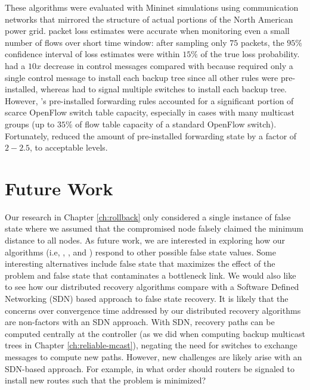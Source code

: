 These algorithms were evaluated with Mininet simulations using communication networks that mirrored the structure of actual portions of the North American power grid.
\pcnt packet loss estimates were accurate when monitoring even a small number of flows over short time window: after sampling only $75$ packets, the $95\%$ confidence interval of \pcnt loss estimates 
were within $15\%$ of the true loss probability. 
\pre had a $10x$ decrease in control messages compared with \post because \pre required only a single control message to install each backup tree since all other rules were pre-installed,
whereas \post had to signal multiple switches to install each backup tree. 
However, \pres's pre-installed forwarding rules accounted for a significant portion of scarce OpenFlow switch table capacity, especially in cases with many multicast groups (up to $35\%$ of
flow table capacity of a standard OpenFlow switch). Fortunately, \merge reduced the amount of pre-installed forwarding state by a factor of $2-2.5$, to acceptable levels.


\section{Future Work}
\label{sec:thesis-future}

Our research in Chapter \ref{ch:rollback} %
only considered a single instance of false state where we assumed that the compromised
node falsely claimed the minimum distance to all nodes.  As future work, we are interested in exploring how our algorithms (i.e, \seconds, \purges, and \cprs) 
respond to other possible false state values. Some interesting alternatives include false state that maximizes the effect of the \infinity problem and false state that contaminates a bottleneck link.
We would also like to see how our distributed recovery algorithms compare with a Software Defined Networking (SDN) based approach to false state recovery. 
It is likely that the concerns over convergence time addressed by our distributed recovery algorithms are non-factors with an SDN approach.  With SDN, recovery paths can be
computed centrally at the controller (as we did when computing backup multicast trees in Chapter \ref{ch:reliable-mcast}), negating the need for switches to exchange messages to compute
new paths. However, new challenges are likely arise with an SDN-based approach. For example, in what order should routers be signaled to install new routes such that 
the \infinity problem is minimized?



